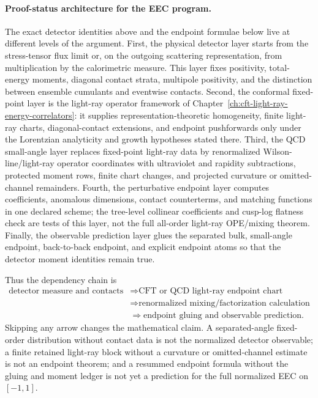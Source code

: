 \paragraph{Proof-status architecture for the EEC program.}
The exact detector identities above and the endpoint formulae below live at
different levels of the argument.  First, the physical detector layer starts
from the stress-tensor flux limit or, on the outgoing scattering
representation, from multiplication by the calorimetric measure.  This layer
fixes positivity, total-energy moments, diagonal contact strata, multipole
positivity, and the distinction between ensemble cumulants and eventwise
contacts.  Second, the conformal fixed-point layer is the light-ray
operator framework of Chapter~\ref{ch:cft-light-ray-energy-correlators}: it
supplies representation-theoretic homogeneity, finite light-ray charts,
diagonal-contact extensions, and endpoint pushforwards only under the
Lorentzian analyticity and growth hypotheses stated there.  Third, the QCD
small-angle layer replaces fixed-point light-ray data by renormalized
Wilson-line/light-ray operator coordinates with ultraviolet and rapidity
subtractions, protected moment rows, finite chart changes, and projected
curvature or omitted-channel remainders.  Fourth, the perturbative endpoint
layer computes coefficients, anomalous dimensions, contact counterterms, and
matching functions in one declared scheme; the tree-level collinear
coefficients and cusp-log flatness check are tests of this layer, not the
full all-order light-ray OPE/mixing theorem.  Finally, the observable
prediction layer glues the separated bulk, small-angle endpoint,
back-to-back endpoint, and explicit endpoint atoms so that the detector
moment identities remain true.

Thus the dependency chain is
\[
  \begin{aligned}
  \text{detector measure and contacts}
  &\Longrightarrow
  \text{CFT or QCD light-ray endpoint chart} \\
  &\Longrightarrow
  \text{renormalized mixing/factorization calculation} \\
  &\Longrightarrow
  \text{endpoint gluing and observable prediction}.
  \end{aligned}
\]
Skipping any arrow changes the mathematical claim.  A separated-angle
fixed-order distribution without contact data is not the normalized detector
observable; a finite retained light-ray block without a curvature or
omitted-channel estimate is not an endpoint theorem; and a resummed endpoint
formula without the gluing and moment ledger is not yet a prediction for the
full normalized EEC on \([-1,1]\).

